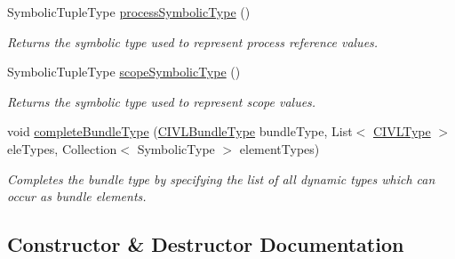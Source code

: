 \begin{DoxyCompactItemize}
Symbolic\+Tuple\+Type \hyperlink{classedu_1_1udel_1_1cis_1_1vsl_1_1civl_1_1model_1_1common_1_1CommonCIVLTypeFactory_a5a2e8812da8e9a7fbf107c6709fd4275}{process\+Symbolic\+Type} ()
\begin{DoxyCompactList}\small\item\em Returns the symbolic type used to represent process reference values. \end{DoxyCompactList}\item 
Symbolic\+Tuple\+Type \hyperlink{classedu_1_1udel_1_1cis_1_1vsl_1_1civl_1_1model_1_1common_1_1CommonCIVLTypeFactory_a25554170fdcf125206d249839640ead2}{scope\+Symbolic\+Type} ()
\begin{DoxyCompactList}\small\item\em Returns the symbolic type used to represent scope values. \end{DoxyCompactList}\item 
void \hyperlink{classedu_1_1udel_1_1cis_1_1vsl_1_1civl_1_1model_1_1common_1_1CommonCIVLTypeFactory_a0e6864d13e6b47b678009e407e133a7f}{complete\+Bundle\+Type} (\hyperlink{interfaceedu_1_1udel_1_1cis_1_1vsl_1_1civl_1_1model_1_1IF_1_1type_1_1CIVLBundleType}{C\+I\+V\+L\+Bundle\+Type} bundle\+Type, List$<$ \hyperlink{interfaceedu_1_1udel_1_1cis_1_1vsl_1_1civl_1_1model_1_1IF_1_1type_1_1CIVLType}{C\+I\+V\+L\+Type} $>$ ele\+Types, Collection$<$ Symbolic\+Type $>$ element\+Types)
\begin{DoxyCompactList}\small\item\em Completes the bundle type by specifying the list of all dynamic types which can occur as bundle elements. \end{DoxyCompactList}\end{DoxyCompactItemize}


\subsection{Constructor \& Destructor Documentation}
\hypertarget{classedu_1_1udel_1_1cis_1_1vsl_1_1civl_1_1model_1_1common_1_1CommonCIVLTypeFactory_afe5187dbc91bf61cd2d17c3c6d10a47a}{}
